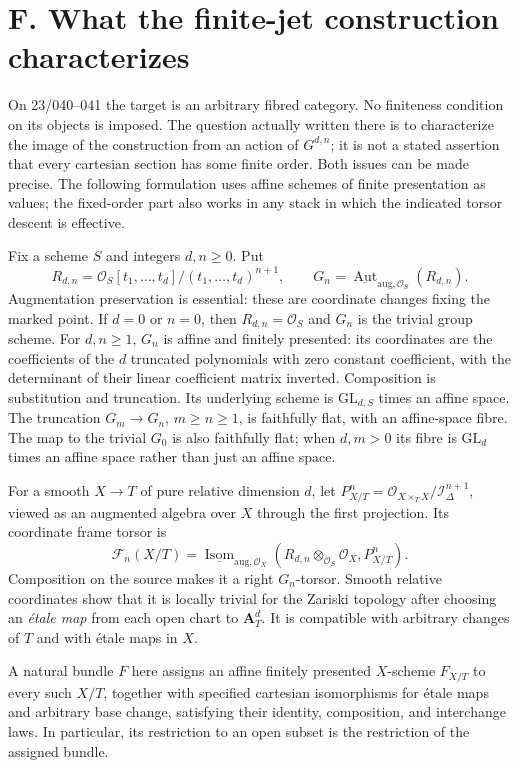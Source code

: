 \section{F. What the finite-jet construction characterizes}
\label{sec:geometry-F}

On 23/040--041 the target is an arbitrary fibred category. No finiteness
condition on its objects is imposed. The question actually written there is
to characterize the image of the construction from an action of
$G^{d,n}$; it is not a stated assertion that every cartesian section has some
finite order. Both issues can be made precise. The following formulation
uses affine schemes of finite presentation as values; the fixed-order part
also works in any stack in which the indicated torsor descent is effective.

Fix a scheme $S$ and integers $d,n\geq0$. Put
\[
 R_{d,n}=\mathcal O_S[t_1,\ldots,t_d]/(t_1,\ldots,t_d)^{n+1},\qquad
 G_n=\underline{\operatorname{Aut}}_{\mathrm{aug},\mathcal O_S}(R_{d,n}).
\]
Augmentation preservation is essential: these are coordinate changes fixing
the marked point. If $d=0$ or $n=0$, then $R_{d,n}=\mathcal O_S$ and
$G_n$ is the trivial group scheme. For $d,n\geq1$, $G_n$ is affine and finitely presented:
its coordinates are the coefficients of the $d$ truncated polynomials with
zero constant coefficient, with the determinant of their linear coefficient
matrix inverted. Composition is substitution and truncation. Its underlying
scheme is $\mathrm{GL}_{d,S}$ times an affine space. The truncation
$G_m\to G_n$, $m\geq n\geq1$, is faithfully flat, with an affine-space fibre.
The map to the trivial $G_0$ is also faithfully flat; when $d,m>0$ its
fibre is $\mathrm{GL}_{d}$ times an affine space rather than just an affine space.

For a smooth $X\to T$ of pure relative dimension $d$, let
$P^n_{X/T}=\mathcal O_{X\times_T X}/\mathcal I_\Delta^{n+1}$, viewed as an
augmented algebra over $X$ through the first projection. Its coordinate
frame torsor is
\[
 \mathcal F_n(X/T)=
 \underline{\operatorname{Isom}}_{\mathrm{aug},\mathcal O_X}
 (R_{d,n}\otimes_{\mathcal O_S}\mathcal O_X,P^n_{X/T}).
\]
Composition on the source makes it a right $G_n$-torsor. Smooth relative
coordinates show that it is locally trivial for the Zariski topology after
choosing an \emph{\'etale map} from each open chart to $\mathbf A^d_T$.
It is compatible with arbitrary changes of $T$ and with \'{e}tale maps in $X$.

A natural bundle $F$ here assigns an affine finitely presented $X$-scheme
$F_{X/T}$ to every such $X/T$, together with specified cartesian
isomorphisms for \'{e}tale maps and arbitrary base change, satisfying their
identity, composition, and interchange laws. In particular, its restriction
to an open subset is the restriction of the assigned bundle.

